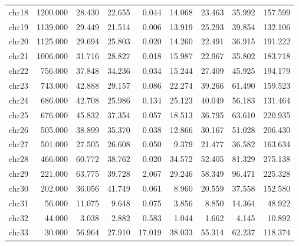 \documentclass{article}
\begin{document}
\begin{table}[htbp]
{\begin{tabular}{lrrrrrrrr}
chr18 & 1200.000 & 28.430 & 22.655 & 0.044 & 14.068 & 23.463 & 35.992 & 157.599 \\
chr19 & 1139.000 & 29.449 & 21.514 & 0.006 & 13.919 & 25.293 & 39.854 & 132.106 \\
chr20 & 1125.000 & 29.694 & 25.803 & 0.020 & 14.260 & 22.491 & 36.915 & 191.222 \\
chr21 & 1006.000 & 31.716 & 28.827 & 0.018 & 15.987 & 22.967 & 35.802 & 183.718 \\
chr22 & 756.000 & 37.848 & 34.236 & 0.034 & 15.244 & 27.409 & 45.925 & 194.179 \\
chr23 & 743.000 & 42.888 & 29.157 & 0.086 & 22.274 & 39.266 & 61.490 & 159.523 \\
chr24 & 686.000 & 42.708 & 25.986 & 0.134 & 25.123 & 40.049 & 56.183 & 131.464 \\
chr25 & 676.000 & 45.832 & 37.354 & 0.057 & 18.513 & 36.795 & 63.610 & 220.935 \\
chr26 & 505.000 & 38.899 & 35.370 & 0.038 & 12.866 & 30.167 & 51.028 & 206.430 \\
chr27 & 501.000 & 27.505 & 26.608 & 0.050 & 9.379 & 21.477 & 36.582 & 163.634 \\
chr28 & 466.000 & 60.772 & 38.762 & 0.020 & 34.572 & 52.405 & 81.329 & 275.138 \\
chr29 & 221.000 & 63.775 & 39.728 & 2.067 & 29.246 & 58.349 & 96.471 & 225.328 \\
chr30 & 202.000 & 36.056 & 41.749 & 0.061 & 8.960 & 20.559 & 37.558 & 152.580 \\
chr31 & 56.000 & 11.075 & 9.648 & 0.075 & 3.856 & 8.850 & 14.364 & 48.922 \\
chr32 & 44.000 & 3.038 & 2.882 & 0.583 & 1.044 & 1.662 & 4.145 & 10.892 \\
chr33 & 30.000 & 56.964 & 27.910 & 17.019 & 38.033 & 55.314 & 62.237 & 118.374 \\
\bottomrule
\end{tabular}
}
\end{table}
\end{document}
